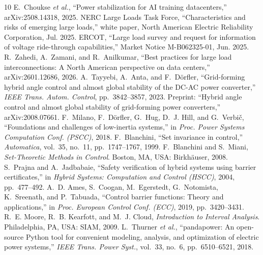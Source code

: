 \documentclass[journal]{IEEEtran}
\theoremstyle{remark}
\begin{document}
\begin{thebibliography}{10}
E.~Choukse \emph{et al.}, ``Power stabilization for AI training datacenters,'' arXiv:2508.14318, 2025.
NERC Large Loads Task Force, ``Characteristics and risks of emerging large loads,'' white paper, North American
Electric Reliability Corporation, Jul. 2025.
ERCOT, ``Large load survey and request for information of voltage ride-through capabilities,'' Market Notice
M-B062325-01, Jun. 2025.
R.~Zahedi, A.~Zamani, and R.~Anilkumar, ``Best practices for large load interconnections: A North American perspective
on data centers,'' arXiv:2601.12686, 2026.
A.~Tayyebi, A.~Anta, and F.~D\"orfler, ``Grid-forming hybrid angle control and almost global stability of the DC-AC
power converter,'' \emph{IEEE Trans. Autom. Control}, pp.~3842--3857, 2023. Preprint: ``Hybrid angle control and
almost global stability of grid-forming power converters,'' arXiv:2008.07661.
F.~Milano, F.~D\"orfler, G.~Hug, D.~J. Hill, and G.~Verbi\v{c}, ``Foundations and challenges of low-inertia systems,''
in \emph{Proc. Power Systems Computation Conf. (PSCC)}, 2018.
F.~Blanchini, ``Set invariance in control,'' \emph{Automatica}, vol.~35, no.~11, pp.~1747--1767, 1999.
F.~Blanchini and S.~Miani, \emph{Set-Theoretic Methods in Control}. Boston, MA, USA: Birkh\"auser, 2008.
S.~Prajna and A.~Jadbabaie, ``Safety verification of hybrid systems using barrier certificates,'' in \emph{Hybrid
Systems: Computation and Control (HSCC)}, 2004, pp.~477--492.
A.~D. Ames, S.~Coogan, M.~Egerstedt, G.~Notomista, K.~Sreenath, and P.~Tabuada, ``Control barrier functions: Theory
and applications,'' in \emph{Proc. European Control Conf. (ECC)}, 2019, pp.~3420--3431.
R.~E. Moore, R.~B. Kearfott, and M.~J. Cloud, \emph{Introduction to Interval Analysis}. Philadelphia, PA, USA: SIAM,
2009.
L.~Thurner \emph{et al.}, ``pandapower: An open-source Python tool for convenient modeling, analysis, and optimization
of electric power systems,'' \emph{IEEE Trans. Power Syst.}, vol.~33, no.~6, pp.~6510--6521, 2018.
\end{thebibliography}
\end{document}
